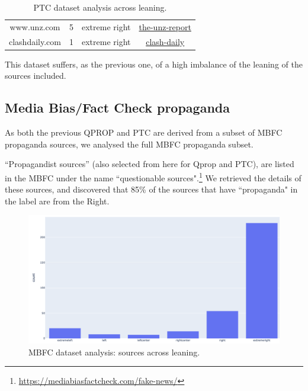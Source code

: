 \begin{table}[!htbp]
{\begin{tabular}{c|r|c|c}
            www.unz.com               & 5          & extreme right                       & \href{https://mediabiasfactcheck.com/the-unz-report/}{the-unz-report}             \\
            clashdaily.com            & 1          & extreme right                       & \href{https://mediabiasfactcheck.com/clash-daily/}{clash-daily}                   \\
        \end{tabular}
    }
    \caption{PTC dataset analysis across leaning.}
    \label{tab:ptc_across_leaning}
\end{table}

This dataset suffers, as the previous one, of a high imbalance of the leaning of the sources included.

\subsection{Media Bias/Fact Check propaganda}
As both the previous QPROP and PTC are derived from a subset of MBFC propaganda sources, we analysed the full MBFC propaganda subset.

“Propagandist sources” (also selected from here for Qprop and PTC), are listed in the MBFC under the name ``questionable sources".\footnote{\url{https://mediabiasfactcheck.com/fake-news/}}
We retrieved the details of these sources, and discovered that 85\% of the sources that have ``propaganda" in the label are from the Right.

\begin{figure}[!htbp]
    \centering
    \includegraphics[width=\linewidth]{figures/leaning_questionable.png}
    \caption{MBFC dataset analysis: sources across leaning.}
    \label{fig:mbfc_across_leaning}
\end{figure}

